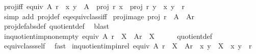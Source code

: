 \begin{isabellebody}
\ proj{\isacharunderscore}{\kern0pt}iff{\isacharcolon}{\kern0pt}\ {\isachardoublequoteopen}equiv\ A\ r\ {\isasymLongrightarrow}\ {\isacharbraceleft}{\kern0pt}x{\isacharcomma}{\kern0pt}\ y{\isacharbraceright}{\kern0pt}\ {\isasymsubseteq}\ A\ {\isasymLongrightarrow}\ proj\ r\ x\ {\isacharequal}{\kern0pt}\ proj\ r\ y\ {\isasymlongleftrightarrow}\ {\isacharparenleft}{\kern0pt}x{\isacharcomma}{\kern0pt}\ y{\isacharparenright}{\kern0pt}\ {\isasymin}\ r{\isachardoublequoteclose}\isanewline
%
\isadelimproof
\ \ %
\endisadelimproof
%
\isatagproof
{}\isamarkupfalse%
\ {\isacharparenleft}{\kern0pt}simp\ add{\isacharcolon}{\kern0pt}\ proj{\isacharunderscore}{\kern0pt}def\ eq{\isacharunderscore}{\kern0pt}equiv{\isacharunderscore}{\kern0pt}class{\isacharunderscore}{\kern0pt}iff{\isacharparenright}{\kern0pt}%
\endisatagproof
{\isafoldproof}%
%
\isadelimproof
\isanewline
%
\endisadelimproof
\isanewline
\isanewline
\isanewline
{}\isamarkupfalse%
\ proj{\isacharunderscore}{\kern0pt}image{\isacharcolon}{\kern0pt}\ {\isachardoublequoteopen}proj\ r\ {\isacharbackquote}{\kern0pt}\ A\ {\isacharequal}{\kern0pt}\ A{\isacharslash}{\kern0pt}{\isacharslash}{\kern0pt}r{\isachardoublequoteclose}\isanewline
%
\isadelimproof
\ \ %
\endisadelimproof
%
\isatagproof
{}\isamarkupfalse%
\ proj{\isacharunderscore}{\kern0pt}def{\isacharbrackleft}{\kern0pt}abs{\isacharunderscore}{\kern0pt}def{\isacharbrackright}{\kern0pt}\ quotient{\isacharunderscore}{\kern0pt}def\ \isamarkupfalse%
\ blast%
\endisatagproof
{\isafoldproof}%
%
\isadelimproof
\isanewline
%
\endisadelimproof
\isanewline
{}\isamarkupfalse%
\ in{\isacharunderscore}{\kern0pt}quotient{\isacharunderscore}{\kern0pt}imp{\isacharunderscore}{\kern0pt}non{\isacharunderscore}{\kern0pt}empty{\isacharcolon}{\kern0pt}\ {\isachardoublequoteopen}equiv\ A\ r\ {\isasymLongrightarrow}\ X\ {\isasymin}\ A{\isacharslash}{\kern0pt}{\isacharslash}{\kern0pt}r\ {\isasymLongrightarrow}\ X\ {\isasymnoteq}\ {\isacharbraceleft}{\kern0pt}{\isacharbraceright}{\kern0pt}{\isachardoublequoteclose}\isanewline
%
\isadelimproof
\ \ %
\endisadelimproof
%
\isatagproof
{}\isamarkupfalse%
\ quotient{\isacharunderscore}{\kern0pt}def\ \isamarkupfalse%
\ equiv{\isacharunderscore}{\kern0pt}class{\isacharunderscore}{\kern0pt}self\ \isamarkupfalse%
\ fast%
\endisatagproof
{\isafoldproof}%
%
\isadelimproof
\isanewline
%
\endisadelimproof
\isanewline
{}\isamarkupfalse%
\ in{\isacharunderscore}{\kern0pt}quotient{\isacharunderscore}{\kern0pt}imp{\isacharunderscore}{\kern0pt}in{\isacharunderscore}{\kern0pt}rel{\isacharcolon}{\kern0pt}\ {\isachardoublequoteopen}equiv\ A\ r\ {\isasymLongrightarrow}\ X\ {\isasymin}\ A{\isacharslash}{\kern0pt}{\isacharslash}{\kern0pt}r\ {\isasymLongrightarrow}\ {\isacharbraceleft}{\kern0pt}x{\isacharcomma}{\kern0pt}\ y{\isacharbraceright}{\kern0pt}\ {\isasymsubseteq}\ X\ {\isasymLongrightarrow}\ {\isacharparenleft}{\kern0pt}x{\isacharcomma}{\kern0pt}\ y{\isacharparenright}{\kern0pt}\ {\isasymin}\ r{\isachardoublequoteclose}\isanewline

\end{isabellebody}

